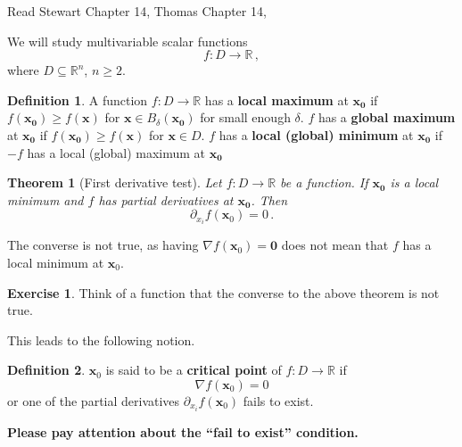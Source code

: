 \documentclass[
]{book}
\newtheorem{theorem}{Theorem}[chapter]
\theoremstyle{definition}
\newtheorem{definition}{Definition}[chapter]
\theoremstyle{definition}
\theoremstyle{definition}
\newtheorem{exercise}{Exercise}[chapter]
\theoremstyle{definition}
\theoremstyle{remark}
\begin{document}
Read Stewart Chapter 14, Thomas Chapter 14,

We will study multivariable scalar functions
\[ f: D \to \mathbb{R}\,,\]
where \(D\subseteq \mathbb{R}^n\), \(n\geq 2\).

\begin{definition}
A function \(f:D \to \mathbb{R}\) has a \textbf{local maximum} at \(\mathbf{x_0}\) if
\(f(\mathbf{x_0}) \geq f(\mathbf{x})\) for \(\mathbf{x} \in B_\delta(\mathbf{x_0})\) for small enough \(\delta\).
\(f\) has a \textbf{global maximum} at \(\mathbf{x_0}\) if
\(f(\mathbf{x_0}) \geq f(\mathbf{x})\) for \(\mathbf{x} \in D\).
\(f\) has a \textbf{local (global) minimum} at \(\mathbf{x_0}\) if
\(-f\) has a local (global) maximum at \(\mathbf{x_0}\)
\end{definition}

\begin{theorem}[First derivative test]
Let \(f:D \to \mathbb{R}\) be a function.
If \(\mathbf{x_0}\) is a local minimum and \(f\) has partial derivatives at \(\mathbf{x_0}\).
Then
\begin{equation*}
    \partial_{x_i} f(\mathbf{x}_0) = 0 \,.
\end{equation*}
\end{theorem}

The converse is not true, as having \(\nabla f(\mathbf{x}_0) = \mathbf{0}\) does not mean
that \(f\) has a local minimum at \(\mathbf{x}_0\).

\begin{exercise}
Think of a function that the converse to the above theorem is not true.
\end{exercise}

This leads to the following notion.

\begin{definition}
\(\mathbf{x}_0\) is said to be a \textbf{critical point} of \(f:D\to \mathbb{R}\) if
\begin{equation*}
    \nabla f(\mathbf{x}_0) = 0
\end{equation*}
or one of the partial derivatives \(\partial_{x_i} f(\mathbf{x}_0)\) fails to exist.
\end{definition}

\textbf{Please pay attention about the ``fail to exist'' condition.}
\end{document}
